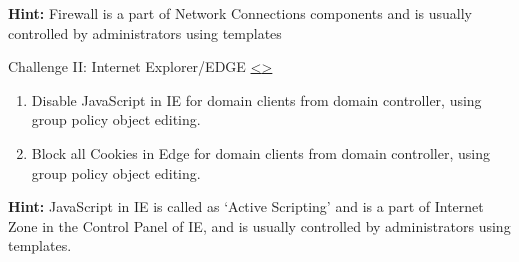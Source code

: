 \documentclass[12pt]{extarticle}
\newenvironment{instructionblock}{\Large\bgroup}{\egroup}
\begin{document}
\vspace{2mm}
\noindent
\textbf{Hint:} Firewall is a part of Network Connections components and is usually controlled by administrators using templates

\vfill




\pagebreak






\pagebreak
\begin{slide}{Challenge II: Internet Explorer/EDGE }{\hyperref[slide 19]{\textless}\hyperref[slide 21]{\textgreater}}
	\begin{instructionblock}
		\begin{enumerate}
			\item {Disable JavaScript in IE for domain clients from domain controller, using group policy object editing.}
			\item {Block all Cookies in Edge for domain clients from domain controller, using group policy object editing.}
		\end{enumerate}
		
	\end{instructionblock}
\end{slide}

\vspace{2mm}
\noindent
\textbf{Hint:} JavaScript in IE is called as `Active Scripting' and is a part of Internet Zone in the Control Panel of IE, and is usually controlled by administrators using templates.

\vfill


\end{document}
